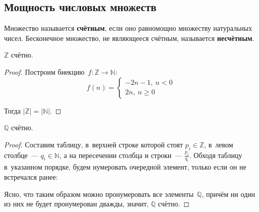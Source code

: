 \subsection{Мощность числовых множеств}
Множество называется \textbf{счётным}, если оно равномощно множеству натуральных чисел.
Бесконечное множество, не являющееся счётным, называется \textbf{несчётным}.

\begin{statement}
$\mathbb Z$ счётно.
\end{statement}
\begin{proof}
Построим биекцию~$f \colon \mathbb Z \to \mathbb N$:
\begin{equation*}
f(n) =
\begin{cases}
-2n - 1, \ n < 0 \\
2n, \ n \geqslant 0
\end{cases}
\end{equation*}

Тогда $|\mathbb Z| = |\mathbb N|$.
\end{proof}

\begin{statement}
$\mathbb Q$ счётно.
\end{statement}
\begin{proof}
Составим таблицу, в~верхней строке которой стоят $p_i \in \mathbb Z$, в~левом столбце~--- $q_i \in \mathbb N$, а на пересечении столбца и строки~--- $\frac{p_i}{q_i}$.
Обходя таблицу в~указанном порядке, будем нумеровать очередной элемент, только если он не встречался ранее:


Ясно, что таким образом можно пронумеровать все элементы~$\mathbb Q$, причём ни один из них не будет пронумерован дважды, значит, $\mathbb Q$ счётно.
\end{proof}

